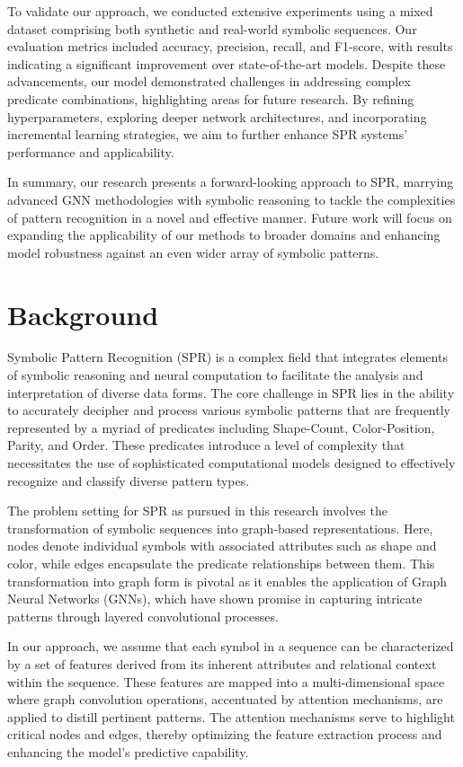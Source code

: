 \documentclass{article}
\begin{document}
To validate our approach, we conducted extensive experiments using a mixed dataset comprising both synthetic and real-world symbolic sequences. Our evaluation metrics included accuracy, precision, recall, and F1-score, with results indicating a significant improvement over state-of-the-art models. Despite these advancements, our model demonstrated challenges in addressing complex predicate combinations, highlighting areas for future research. By refining hyperparameters, exploring deeper network architectures, and incorporating incremental learning strategies, we aim to further enhance SPR systems' performance and applicability.

In summary, our research presents a forward-looking approach to SPR, marrying advanced GNN methodologies with symbolic reasoning to tackle the complexities of pattern recognition in a novel and effective manner. Future work will focus on expanding the applicability of our methods to broader domains and enhancing model robustness against an even wider array of symbolic patterns.

\section{Background}
Symbolic Pattern Recognition (SPR) is a complex field that integrates elements of symbolic reasoning and neural computation to facilitate the analysis and interpretation of diverse data forms. The core challenge in SPR lies in the ability to accurately decipher and process various symbolic patterns that are frequently represented by a myriad of predicates including Shape-Count, Color-Position, Parity, and Order. These predicates introduce a level of complexity that necessitates the use of sophisticated computational models designed to effectively recognize and classify diverse pattern types.

The problem setting for SPR as pursued in this research involves the transformation of symbolic sequences into graph-based representations. Here, nodes denote individual symbols with associated attributes such as shape and color, while edges encapsulate the predicate relationships between them. This transformation into graph form is pivotal as it enables the application of Graph Neural Networks (GNNs), which have shown promise in capturing intricate patterns through layered convolutional processes.

In our approach, we assume that each symbol in a sequence can be characterized by a set of features derived from its inherent attributes and relational context within the sequence. These features are mapped into a multi-dimensional space where graph convolution operations, accentuated by attention mechanisms, are applied to distill pertinent patterns. The attention mechanisms serve to highlight critical nodes and edges, thereby optimizing the feature extraction process and enhancing the model's predictive capability.
\end{document}
